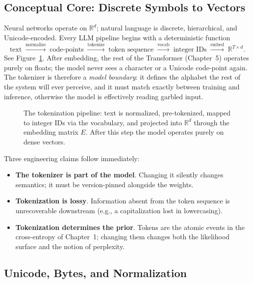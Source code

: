 \subsection{Conceptual Core: Discrete Symbols to Vectors}

Neural networks operate on $\mathbb{R}^d$; natural language is discrete,
hierarchical, and Unicode-encoded. Every LLM pipeline begins with a
deterministic function
\begin{equation}
\label{eq:week3-pipeline}
\text{text} \;\xrightarrow{\text{normalize}}\;
\text{code-points} \;\xrightarrow{\text{tokenize}}\;
\text{token sequence} \;\xrightarrow{\text{vocab}}\;
\text{integer IDs} \;\xrightarrow{\text{embed}}\;
\mathbb{R}^{T \times d}.
\end{equation}
See Figure~\ref{fig:week3-pipeline}. After embedding, the rest of the
Transformer (Chapter~5) operates purely on floats; the model never sees a
character or a Unicode code-point again. The tokenizer is therefore a
\emph{model boundary}: it defines the alphabet the rest of the system
will ever perceive, and it must match exactly between training and
inference, otherwise the model is effectively reading garbled input.

\begin{figure}[h]
\centering

\caption{The tokenization pipeline: text is normalized, pre-tokenized,
  mapped to integer IDs via the vocabulary, and projected into
  $\mathbb{R}^d$ through the embedding matrix $E$.
  After this step the model operates purely on dense vectors.}
\label{fig:week3-pipeline}
\end{figure}

Three engineering claims follow immediately:
\begin{itemize}
  \item \textbf{The tokenizer is part of the model}. Changing it
        silently changes semantics; it must be version-pinned alongside
        the weights.
  \item \textbf{Tokenization is lossy}. Information absent from the
        token sequence is unrecoverable downstream (e.g., a
        capitalization lost in lowercasing).
  \item \textbf{Tokenization determines the prior}. Tokens are the
        atomic events in the cross-entropy of Chapter~1; changing them
        changes both the likelihood surface and the notion of
        perplexity.
\end{itemize}

\subsection{Unicode, Bytes, and Normalization}


